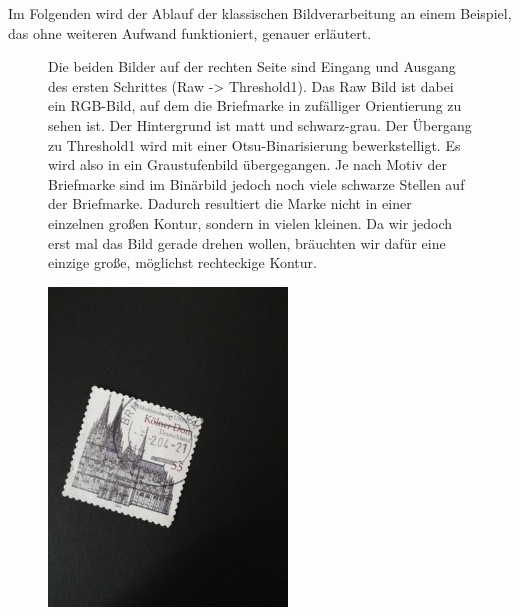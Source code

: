 \documentclass[12pt,toc=bib,toc=listof]{scrreprt}
\begin{document}
Im Folgenden wird der Ablauf der klassischen Bildverarbeitung an einem Beispiel, das ohne weiteren Aufwand funktioniert, genauer erläutert.
\begin{figure}

\begin{minipage}[t]{.75\linewidth}
Die beiden Bilder auf der rechten Seite sind Eingang und Ausgang des ersten Schrittes (Raw -> Threshold1). Das Raw Bild ist dabei ein RGB-Bild, auf dem die Briefmarke in zufälliger Orientierung zu sehen ist. Der Hintergrund ist matt und schwarz-grau. Der Übergang zu Threshold1 wird mit einer Otsu-Binarisierung bewerkstelligt. Es wird also in ein Graustufenbild übergegangen. Je nach Motiv der Briefmarke sind im Binärbild jedoch noch viele schwarze Stellen auf der Briefmarke. Dadurch resultiert die Marke nicht in einer einzelnen großen Kontur, sondern in vielen kleinen. Da wir jedoch erst mal das Bild gerade drehen wollen, bräuchten wir dafür eine einzige große, möglichst rechteckige Kontur.
\end{minipage}
\hfill
\begin{minipage}[t]{.2\linewidth}
  \strut\vspace*{-\baselineskip}\newline\includegraphics[width=\linewidth]{./../bilder/start_dom}

\end{minipage}
\end{figure}
\end{document}
